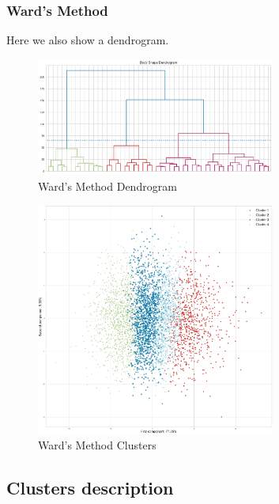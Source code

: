 \documentclass[12pt,a4paper,openany,UKenglish]{scrreprt}
\begin{document}
\subsubsection{Ward's Method}
Here we also show a dendrogram.
\begin{figure}[H]
	\centering
	\caption{Ward's Method Dendrogram}
	\includegraphics[width=0.7\textwidth]{../Images/MDendrogram.png}
\end{figure}

\begin{figure}[H]
	\centering
	\caption{Ward's Method Clusters}
	\includegraphics[width=0.7\textwidth]{../Images/MHierProjection.png}
\end{figure}

\subsection{Clusters description}
\end{document}
